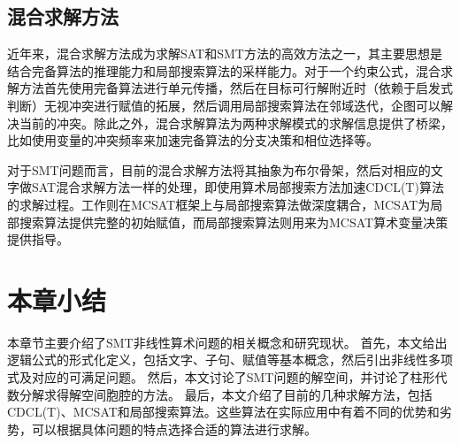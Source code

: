 \subsection{混合求解方法}
近年来，混合求解方法\cite{CaiZ21}成为求解SAT和SMT方法的高效方法之一，其主要思想是结合完备算法的推理能力和局部搜索算法的采样能力。对于一个约束公式，混合求解方法首先使用完备算法进行单元传播，然后在目标可行解附近时（依赖于启发式判断）无视冲突进行赋值的拓展，然后调用局部搜索算法在邻域迭代，企图可以解决当前的冲突。除此之外，混合求解算法为两种求解模式的求解信息提供了桥梁，比如使用变量的冲突频率来加速完备算法的分支决策和相位选择等。

对于SMT问题而言，目前的混合求解方法\cite{hybridSMT}将其抽象为布尔骨架，然后对相应的文字做SAT混合求解方法一样的处理，即使用算术局部搜索方法加速CDCL(T)算法的求解过程。工作\cite{BoostMcsat}则在MCSAT框架上与局部搜索算法做深度耦合，MCSAT为局部搜索算法提供完整的初始赋值，而局部搜索算法则用来为MCSAT算术变量决策提供指导。

\section{本章小结}

本章节主要介绍了SMT非线性算术问题的相关概念和研究现状。
首先，本文给出逻辑公式的形式化定义，包括文字、子句、赋值等基本概念，然后引出非线性多项式及对应的可满足问题。
然后，本文讨论了SMT问题的解空间，并讨论了柱形代数分解求得解空间胞腔的方法。
最后，本文介绍了目前的几种求解方法，包括CDCL(T)、MCSAT和局部搜索算法。这些算法在实际应用中有着不同的优势和劣势，可以根据具体问题的特点选择合适的算法进行求解。